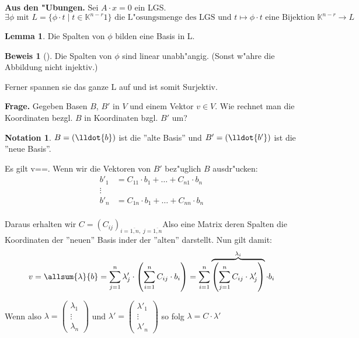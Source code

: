 \documentclass[oneside,fontsize=11pt,paper=a4,BCOR=0mm,DIV=12,automark,headsepline]{scrbook}
\theoremstyle{remark}
\theoremstyle{definition}
\newtheorem*{notation}{Notation}
\newtheorem{lemma}{Lemma}[section]
\theoremstyle{definition}
\newtheorem*{prof}{Beweis}
\theoremstyle{remark}
\begin{document}
\textbf{Aus den "Ubungen.} Sei $A\cdot x = 0$ ein LGS.
\[\exists \phi \text{ mit } L=\{\phi\cdot t\mid t\in
  \mathbb{K}^{n-r}1\} \text{ die L"osungsmenge des LGS und } t \mapsto
  \phi\cdot t \text{ eine Bijektion } \mathbb{K}^{n-r}\rightarrow
  L\]

\begin{lemma}
  Die Spalten von \(\phi\) bilden eine Basis in L.
\end{lemma}

\begin{prof}[]
  Die Spalten von \(\phi\) sind linear unabh"angig. (Sonst w"ahre die Abbildung nicht injektiv.)

  Ferner spannen sie das ganze L auf und ist somit Surjektiv. 
\end{prof}

\textbf{Frage.} Gegeben Basen $B$, $B'$ in \(V\) und einem Vektor \(v\in V\). Wie rechnet man die
Koordinaten bezgl. $B$ in Koordinaten bzgl. $B'$ um?

\begin{notation}
$B=(\lldot{b})$ ist die ''alte Basis'' und $B'=(\lldot{b'})$ ist die ''neue Basis''.
\end{notation}

Es gilt v==. Wenn wir die Vektoren von $B'$ bez"uglich $B$
ausdr"ucken:
\[
  \begin{split}
    b'_1 & = C_{11}\cdot b_1 + \dots + C_{n1}\cdot b_n\\
    \vdots &\\
    b'_n & = C_{1n}\cdot b_1 + \dots + C_{nn}\cdot b_n\\
  \end{split}
\]

Daraus erhalten wir
$C=(C_{ij})_{i=\overline{1, n},\;j=\overline{1, n}}$\quad Also eine Matrix
deren Spalten die Koordinaten der ''neuen'' Basis inder der ''alten'' darstellt.
Nun gilt damit: \[v=\allsum{\lambda}{b}=\sum_{j=1}^{n}{\lambda'_j\cdot \left({\sum_{i=1}^{n}{C_{ij}\cdot b_i}}\right)}=\sum_{i=1}^n\overbrace{\left({\sum_{j=1}^n{C_{ij}\cdot \lambda'_j}}\right)}^{\lambda_i}\cdot b_i\]

Wenn also $\lambda=\begin{pmatrix}\lambda_1 \\ \vdots \\ \lambda_n\end{pmatrix}$ und $\lambda'=\begin{pmatrix}\lambda'_1 \\ \vdots \\ \lambda'_n\end{pmatrix}$ so folg \(\lambda = C\cdot \lambda'\)
\end{document}
